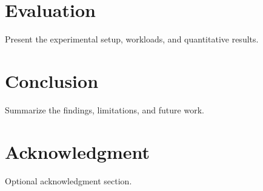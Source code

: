 \documentclass[conference]{IEEEtran}
\begin{document}
\section{Evaluation}
Present the experimental setup, workloads, and quantitative results.


\section{Conclusion}
Summarize the findings, limitations, and future work.

\section*{Acknowledgment}
Optional acknowledgment section.



\end{document}
